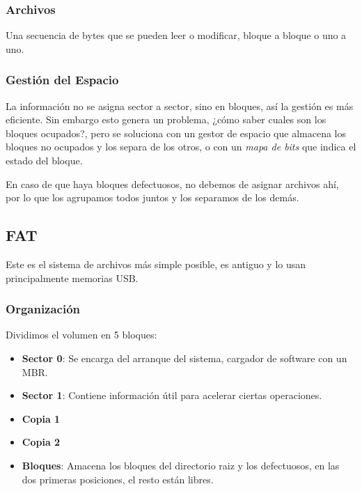 \subsubsection{Archivos}
Una secuencia de bytes que se pueden leer o modificar, bloque a bloque o uno a uno.
\subsubsection{Gestión del Espacio}
La información no se asigna sector a sector, sino en bloques, así la gestión es más eficiente. Sin embargo esto genera un problema, ¿cómo saber cuales son los bloques ocupados?, pero se soluciona con un gestor de espacio que almacena los bloques no ocupados y los separa de los otros, o con un \textit{mapa de bits} que indica el estado del bloque.
\par  En caso de que haya bloques defectuosos, no debemos de asignar archivos ahí, por lo que los agrupamos todos juntos y los separamos de los demás.
\subsection{FAT}
Este es el sistema de archivos más simple posible, es antiguo y lo usan principalmente memorias USB.
\subsubsection{Organización}
Dividimos el volumen en 5 bloques:
\begin{itemize}
        \item  \textbf{Sector 0}: Se encarga del arranque del sistema, cargador de software con un MBR.\item  \textbf{Sector 1}: Contiene información útil para acelerar ciertas operaciones.\item  \textbf{Copia 1}\item  \textbf{Copia 2}\item \textbf{Bloques}: Amacena los bloques del directorio raiz y los defectuosos, en las dos primeras posiciones, el resto están libres.
\end{itemize}
